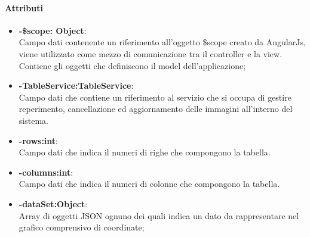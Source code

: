 	\paragraph{Attributi}
	\begin{itemize}
		\item \textbf{-\$scope: Object}:\\
			Campo dati contenente un riferimento all'oggetto \$scope creato da AngularJs, viene utilizzato come mezzo di comunicazione tra il controller e la view. Contiene gli oggetti che definiscono il model dell'applicazione;
		\item  \textbf{-TableService:TableService}:\\
			Campo dati che contiene un riferimento al servizio che si occupa di gestire reperimento, cancellazione ed aggiornamento delle immagini all'interno del sistema.
		\item\textbf{-rows:int}:\\
			Campo dati che indica il numeri di righe che compongono la tabella.
		\item\textbf{-columns:int}:\\
			Campo dati che indica il numeri di colonne che compongono la tabella.
		\item\textbf{-dataSet:Object}:\\
			Array di oggetti JSON ognuno dei quali indica un dato da rappresentare nel grafico comprensivo di coordinate;
	\end{itemize}
	
